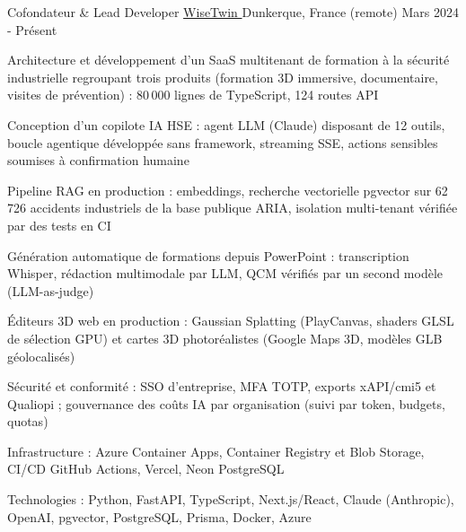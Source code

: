 


\begin{cventries}


\cventry
{Cofondateur \& Lead Developer} %
{\href{https://www.wisetwin.eu}{WiseTwin {\tiny\textcolor{black}{\faExternalLink}}}} %
{Dunkerque, France (remote)} %
{Mars 2024 - Présent} %
{ %
\begin{cvitems}
\item {Architecture et développement d'un SaaS multitenant de formation à la sécurité industrielle regroupant trois produits (formation 3D immersive, documentaire, visites de prévention) : 80\,000 lignes de TypeScript, 124 routes API}
\item {Conception d'un copilote IA HSE : agent LLM (Claude) disposant de 12 outils, boucle agentique développée sans framework, streaming SSE, actions sensibles soumises à confirmation humaine}
\item {Pipeline RAG en production : embeddings, recherche vectorielle pgvector sur 62\,726 accidents industriels de la base publique ARIA, isolation multi-tenant vérifiée par des tests en CI}
\item {Génération automatique de formations depuis PowerPoint : transcription Whisper, rédaction multimodale par LLM, QCM vérifiés par un second modèle (LLM-as-judge)}
\item {Éditeurs 3D web en production : Gaussian Splatting (PlayCanvas, shaders GLSL de sélection GPU) et cartes 3D photoréalistes (Google Maps 3D, modèles GLB géolocalisés)}
\item {Sécurité et conformité : SSO d'entreprise, MFA TOTP, exports xAPI/cmi5 et Qualiopi ; gouvernance des coûts IA par organisation (suivi par token, budgets, quotas)}
\item {Infrastructure : Azure Container Apps, Container Registry et Blob Storage, CI/CD GitHub Actions, Vercel, Neon PostgreSQL}
\item {Technologies : Python, FastAPI, TypeScript, Next.js/React, Claude (Anthropic), OpenAI, pgvector, PostgreSQL, Prisma, Docker, Azure}
\end{cvitems}
}


\end{cventries}
